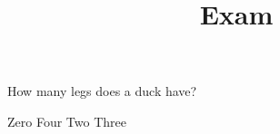 \documentclass{exam}
\title{Exam}
\begin{document}
\begin{questions}
    \question How many legs does a duck have?
        \begin{checkboxes}
            \choice Zero
            \choice Four
            \CorrectChoice Two
            \choice Three
        \end{checkboxes}
\end{questions}
\end{document}
